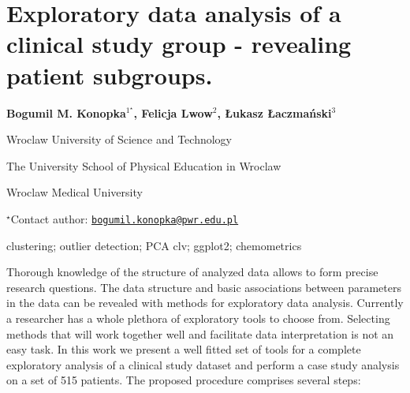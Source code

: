 \documentclass[\main/boa.tex]{subfiles}
\begin{document}
\pagestyle{empty}

\section{Exploratory data analysis of a clinical study group - revealing patient
subgroups.}

\begin{center}
  {\bf Bogumil M. Konopka$^{1^\star}$, Felicja Lwow$^{2}$, Łukasz Łaczmański$^{3}$}
\end{center}

\vskip 0.3cm

\begin{affiliations}
\begin{enumerate}
\begin{minipage}{0.915\textwidth}
\centering
\item Wroclaw University of Science and Technology \\[-2pt]
\item The University School of Physical Education in Wroclaw \\[-2pt]
\item Wroclaw Medical University \\[-2pt]
\end{minipage}
\end{enumerate}
$^\star$Contact author: \href{mailto:bogumil.konopka@pwr.edu.pl}{\nolinkurl{bogumil.konopka@pwr.edu.pl}}\\
\end{affiliations}

\vskip 0.5cm

\begin{minipage}{0.915\textwidth}
\keywords clustering; outlier detection; PCA
\packages clv; ggplot2; chemometrics
\end{minipage}

\vskip 0.8cm

Thorough knowledge of the structure of analyzed data allows to form
precise research questions. The data structure and basic associations
between parameters in the data can be revealed with methods for
exploratory data analysis. Currently a researcher has a whole plethora
of exploratory tools to choose from. Selecting methods that will work
together well and facilitate data interpretation is not an easy task. In
this work we present a well fitted set of tools for a complete
exploratory analysis of a clinical study dataset and perform a case
study analysis on a set of 515 patients. The proposed procedure
comprises several steps:
\end{document}
